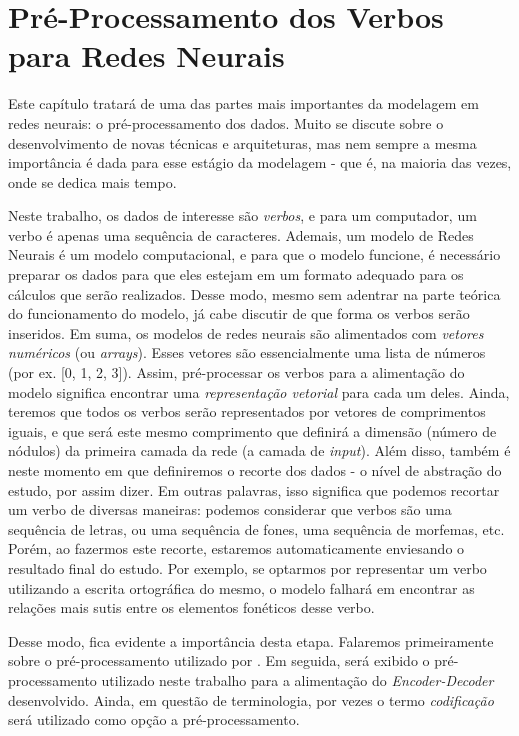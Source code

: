 \chapter{Pré-Processamento dos Verbos para Redes Neurais}
\label{ch:02}

Este capítulo tratará de uma das partes mais importantes da modelagem em redes neurais: o pré-processamento dos dados. Muito se discute sobre o desenvolvimento de novas técnicas e arquiteturas, mas nem sempre a mesma importância é dada para esse estágio da modelagem - que é, na maioria das vezes, onde se dedica mais tempo. 

Neste trabalho, os dados de interesse são \textit{verbos}, e para um computador, um verbo é apenas uma sequência de caracteres. Ademais, um modelo de Redes Neurais é um modelo computacional, e para que o modelo funcione, é necessário preparar os dados para que eles estejam em um formato adequado para os cálculos que serão realizados. Desse modo, mesmo sem adentrar na parte teórica do funcionamento do modelo, já cabe discutir de que forma os verbos serão inseridos. Em suma, os modelos de redes neurais são alimentados com \textit{vetores numéricos} (ou \textit{arrays}). Esses vetores são essencialmente uma lista de números (por ex. [0, 1, 2, 3]). Assim, pré-processar os verbos para a alimentação do modelo significa encontrar uma \textit{representação vetorial} para cada um deles. Ainda, teremos que todos os verbos serão representados por vetores de comprimentos iguais, e que será este mesmo comprimento que definirá a dimensão (número de nódulos) da primeira camada da rede (a camada de \textit{input}). Além disso, também é neste momento em que definiremos o recorte dos dados - o nível de abstração do estudo, por assim dizer. Em outras palavras, isso significa que podemos recortar um verbo de diversas maneiras: podemos considerar que verbos são uma sequência de letras, ou uma sequência de fones, uma sequência de morfemas, etc. Porém, ao fazermos este recorte, estaremos automaticamente enviesando o resultado final do estudo. Por exemplo, se optarmos por representar um verbo utilizando a escrita ortográfica do mesmo, o modelo falhará em encontrar as relações mais sutis entre os elementos fonéticos desse verbo.

Desse modo, fica evidente a importância desta etapa. Falaremos primeiramente sobre o pré-processamento utilizado por \cite{rumelhart:1986}. Em seguida, será exibido o pré-processamento utilizado neste trabalho para a alimentação do \textit{Encoder-Decoder} desenvolvido. Ainda, em questão de terminologia, por vezes o termo \textit{codificação} será utilizado como opção a pré-processamento.  

